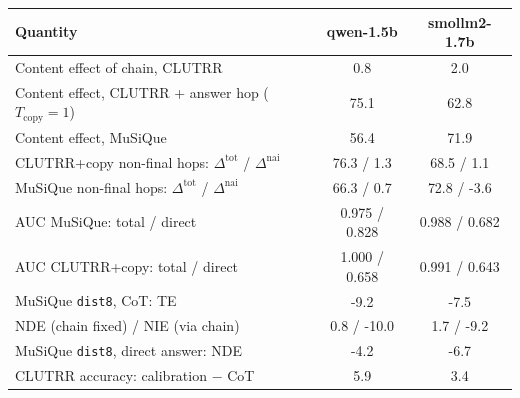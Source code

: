 \begin{tabular}{lcc}
\toprule
Quantity & qwen-1.5b & smollm2-1.7b \\
\midrule
Content effect of chain, CLUTRR & 0.8 & 2.0 \\
Content effect, CLUTRR + answer hop ($T_{\text{copy}}{=}1$) & 75.1 & 62.8 \\
Content effect, MuSiQue & 56.4 & 71.9 \\
CLUTRR+copy non-final hops: $\Delta^{\text{tot}}$ / $\Delta^{\text{nai}}$ & 76.3 / 1.3 & 68.5 / 1.1 \\
MuSiQue non-final hops: $\Delta^{\text{tot}}$ / $\Delta^{\text{nai}}$ & 66.3 / 0.7 & 72.8 / -3.6 \\
AUC MuSiQue: total / direct & 0.975 / 0.828 & 0.988 / 0.682 \\
AUC CLUTRR+copy: total / direct & 1.000 / 0.658 & 0.991 / 0.643 \\
MuSiQue \texttt{dist8}, CoT: TE & -9.2 & -7.5 \\
\quad NDE (chain fixed) / NIE (via chain) & 0.8 / -10.0 & 1.7 / -9.2 \\
MuSiQue \texttt{dist8}, direct answer: NDE & -4.2 & -6.7 \\
CLUTRR accuracy: calibration $-$ CoT & 5.9 & 3.4 \\
\bottomrule
\end{tabular}
